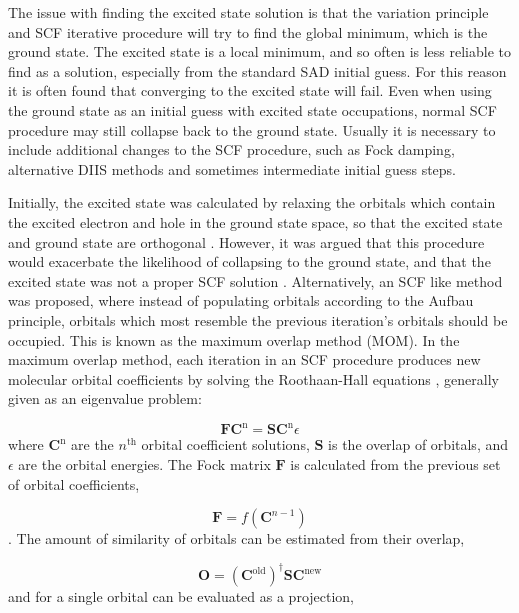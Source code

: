 The issue with finding the excited state solution is that the variation principle
and SCF iterative procedure will try to find the global minimum, which is the 
ground state. The excited state is a local minimum, and so often is less reliable
to find as a solution, especially from the standard SAD initial guess.
For this reason it is often found that converging to the \dscf excited state will
fail. Even when using the ground state as an initial guess with excited state
occupations, normal SCF procedure may still collapse back to the ground state.
Usually it is necessary to include additional changes to the SCF procedure,
such as Fock damping, alternative DIIS methods and sometimes intermediate 
initial guess steps.

Initially, the excited state was calculated by relaxing the orbitals which
contain the excited electron and hole in the ground state space, so that the
excited state and ground state are orthogonal \cite{Hunt1969}. However, it was
argued that this procedure would exacerbate the likelihood of collapsing to the ground
state, and that the excited state was not a proper SCF solution \cite{Gilbert2008}.
Alternatively, an SCF like method was proposed, where instead of
populating orbitals according to the Aufbau principle, orbitals which most
resemble the previous iteration's orbitals should be occupied. This is known as 
the maximum overlap method (MOM). In the maximum overlap method, each iteration 
in an SCF procedure produces new molecular orbital coefficients by solving the 
Roothaan-Hall equations \cite{Roothaan1951}, generally given as an eigenvalue problem:

\begin{equation}
\mathbf{F} \mathbf{C}^{\text{n}} = \mathbf{S} \mathbf{C}^{\text{n}} \epsilon
\label{eq:roothaan_hall}
\end{equation}
%
where $\mathbf{C}^{\text{n}}$ are the $n^{\text{th}}$ orbital coefficient solutions, 
$\mathbf{S}$ is the overlap of orbitals, and $\epsilon$ are the orbital energies. 
The Fock matrix $\mathbf{F}$ is calculated from the previous set of orbital 
coefficients,

\begin{equation}
\mathbf{F} = f\left(\mathbf{C}^{n-1}\right)
\end{equation}
%
. The amount of similarity of orbitals can be estimated from their overlap,

\begin{equation}
\mathbf{O} = \left(\mathbf{C}^{\text{old}}\right)^\dagger \mathbf{S} \mathbf{C}^{\text{new}}
\end{equation}
%
and for a single orbital can be evaluated as a projection,

